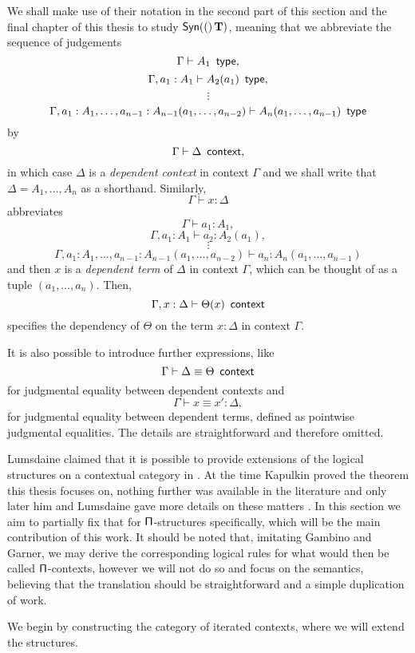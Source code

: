 \begin{notation}
  We shall make use of their notation \cite[4]{GG08} in the second part of this
  section and the final chapter of this thesis to study $\mathsf{Syn}(\mathbf{(})\operatorname{\mathbf{T}})$, meaning that
  we abbreviate the sequence of judgements
  \[\Gamma\vdash A_1\operatorname{\ \mathsf{type}},\]
  \[\Gamma,a_1:A_1\vdash A_2(a_1)\operatorname{\ \mathsf{type}},\]
  \[\vdots\]
  \[\Gamma,a_1:A_1,\ldots,a_{n-1}:A_{n-1}(a_1,\ldots,a_{n-2})\vdash
  A_n(a_1,\ldots,a_{n-1})\operatorname{\ \mathsf{type}}\]
  by
  \[\Gamma\vdash\Delta\operatorname{\ \mathsf{context}},\]
  in which case $\Delta$ is a \emph{dependent context} in context $\Gamma$ and
  we shall write that $\Delta=A_1,\ldots,A_n$ as a shorthand.
  Similarly,
  \[\Gamma\vdash x:\Delta\]
  abbreviates
  \[\Gamma\vdash a_1:A_1,\]
  \[\Gamma,a_1:A_1\vdash a_2:A_2(a_1),\]
  \[\vdots\]
  \[\Gamma,a_1:A_1,\ldots,a_{n-1}:A_{n-1}(a_1,\ldots,a_{n-2})\vdash
  a_n:A_n(a_1,\ldots,a_{n-1})\]
  and then $x$ is a \emph{dependent term} of $\Delta$ in context $\Gamma$, which
  can be thought of as a tuple $(a_1,\ldots,a_n)$. Then,
  \[\Gamma,x:\Delta\vdash\Theta(x)\operatorname{\ \mathsf{context}}\]
  specifies the dependency of $\Theta$ on the term $x:\Delta$ in context
  $\Gamma$.

  \noindent
  It is also possible to introduce further expressions, like
  \[\Gamma\vdash \Delta\equiv\Theta\operatorname{\ \mathsf{context}}\]
  for judgmental equality between dependent contexts and
  \[\Gamma\vdash x\equiv x':\Delta,\]
  for judgmental equality between dependent terms, defined as pointwise
  judgmental equalities. The details are straightforward and therefore omitted.
\end{notation}
\noindent

Lumsdaine claimed that it is possible to provide extensions of the logical
structures on a contextual category in \cite[26]{Lum10}. At the
time Kapulkin proved the theorem this thesis focuses on,
nothing further was available in the literature and only later him and
Lumsdaine gave more details on these matters \cite{KL18}. In this section we aim
to partially fix that for $\operatorname{\mathsf{\Pi}}$-structures specifically, which will be the main
contribution of this work. It should be noted that, imitating Gambino and
Garner, we may derive the
corresponding logical rules for what would then be called $\operatorname{\mathsf{\Pi}}$-contexts,
however we will not do so and focus on the semantics, believing that the
translation should be straightforward and a simple duplication of work.

We begin by constructing the category of iterated contexts, where we
will extend the structures.

